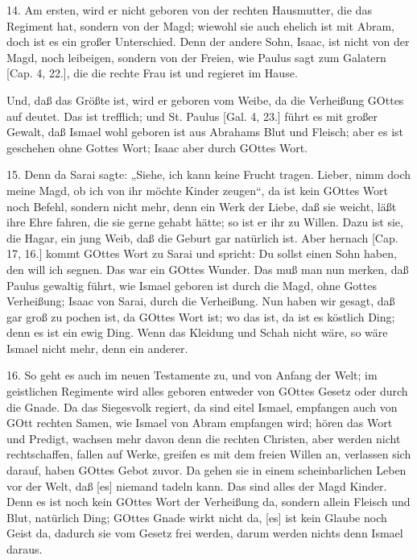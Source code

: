 14. Am ersten, wird er nicht geboren von der rechten Hausmutter, die das Regiment hat, sondern von der Magd; wiewohl sie auch ehelich ist mit Abram, doch ist es ein großer Unterschied. Denn der andere Sohn, Isaac, ist nicht von der Magd, noch leibeigen, sondern von der Freien, wie Paulus sagt zum Galatern [Cap. 4, 22.], die die rechte Frau ist und regieret im Hause.


Und, daß das Größte ist, wird er geboren vom Weibe, da die Verheißung GOttes auf deutet. Das ist trefflich; und St. Paulus [Gal. 4, 23.] führt es mit großer Gewalt, daß Ismael wohl geboren ist aus Abrahams Blut und Fleisch; aber es ist geschehen ohne Gottes Wort; Isaac aber durch GOttes Wort.

15. Denn da Sarai sagte: „Siehe, ich kann keine Frucht tragen. Lieber, nimm doch meine Magd, ob ich von ihr möchte Kinder zeugen“, da ist kein GOttes Wort noch Befehl, sondern nicht mehr, denn ein Werk der Liebe, daß sie weicht, läßt ihre Ehre fahren, die sie gerne gehabt hätte; so ist er ihr zu Willen. Dazu ist sie, die Hagar, ein jung Weib, daß die Geburt gar natürlich ist. Aber hernach [Cap. 17, 16.] kommt GOttes Wort zu Sarai und spricht: Du sollst einen Sohn haben, den will ich segnen. Das war ein GOttes Wunder. Das muß man nun merken, daß Paulus gewaltig führt, wie Ismael geboren ist durch die Magd, ohne Gottes Verheißung; Isaac von Sarai, durch die Verheißung. Nun haben wir gesagt, daß gar groß zu pochen ist, da GOttes Wort ist; wo das ist, da ist es köstlich Ding; denn es ist ein ewig Ding. Wenn das Kleidung und Schah nicht wäre, so wäre Ismael nicht mehr, denn ein anderer.

16. So geht es auch im neuen Testamente zu, und von Anfang der Welt; im geistlichen Regimente wird alles geboren entweder von GOttes Gesetz oder durch die Gnade. Da das Siegesvolk regiert, da sind eitel Ismael, empfangen auch von GOtt rechten Samen, wie Ismael von Abram empfangen wird; hören das Wort und Predigt, wachsen mehr davon denn die rechten Christen, aber werden nicht rechtschaffen, fallen auf Werke, greifen es mit dem freien Willen an, verlassen sich darauf, haben GOttes Gebot zuvor. Da gehen sie in einem scheinbarlichen Leben vor der Welt, daß [es] niemand tadeln kann. Das sind alles der Magd Kinder. Denn es ist noch kein GOttes Wort der Verheißung da, sondern allein Fleisch und Blut, natürlich Ding; GOttes Gnade wirkt nicht da, [es] ist kein Glaube noch Geist da, dadurch sie vom Gesetz frei werden, darum werden nichts denn Ismael daraus.

